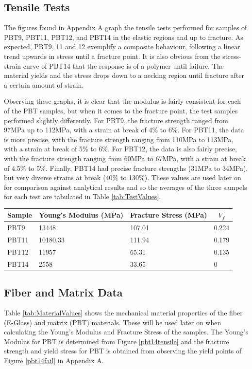 \documentclass[11pt]{article}
\begin{document}
\subsection{Tensile Tests}
The figures found in Appendix A graph the tensile tests performed for samples of PBT9, PBT11, PBT12, and PBT14 in the elastic regions and up to fracture. As expected, PBT9, 11 and 12 exemplify a composite behaviour, following a linear trend upwards in stress until a fracture point. It is also obvious from the stress-strain curve of PBT14  that the response is of a polymer until failure. The material yields and the stress drops down to a necking region until fracture after a certain amount of strain.

Observing these graphs, it is clear that the modulus is fairly consistent for each of the PBT samples, but when it comes to the fracture point, the test samples performed slightly differently. For PBT9, the fracture strength ranged from 97MPa up to 112MPa, with a strain at break of 4\% to 6\%. For PBT11, the data is more precise, with the fracture strength ranging from 110MPa to 113MPa, with a strain at break of 5\% to 6\%. For PBT12, the data is also fairly precise, with the fracture strength ranging from 60MPa to 67MPa, with a strain at break of 4.5\% to 5\%. Finally, PBT14 had precise fracture strengths (31MPa to 34MPa), but very diverse strains at break (40\% to 130\%). These values are used later on for comparison against analytical results and so the averages of the three sampels for each test are tabulated in Table \ref{tab:TestValues}.

\onehalfspacing
\begin{center}
 \label{tab:TestValues}
\begin{tabular}{p{1.5cm} || p{} | p{} | p{1.5cm} }
\hline
Sample & \multicolumn{1}{c|}{Young's Modulus (MPa)} & \multicolumn{1}{c|}{Fracture Stress (MPa)} & \multicolumn{1}{c}{\(V_f\)}  \\
\hline
\hline
PBT9 & 13448 & 107.01 & 0.224\\
PBT11 & 10180.33  & 111.94 & 0.179\\
PBT12 & 11957 & 65.31 & 0.135 \\
PBT14 & 2558 & 33.65 & 0\\
\hline
\end{tabular}
\end{center}
\singlespacing

\subsection{Fiber and Matrix Data}
Table \ref{tab:MaterialValues} shows the mechanical material properties of the fiber (E-Glass) and matrix (PBT) materials. These will be used later on when calculating the Young's Modulus and Fracture Stress of the samples. The Young's Modulus for PBT is determined from Figure \ref{pbt14tensile} and the fracture strength and yield stress for PBT is obtained from observing the yield points of Figure \ref{pbt14fail} in Appendix A.
\end{document}
